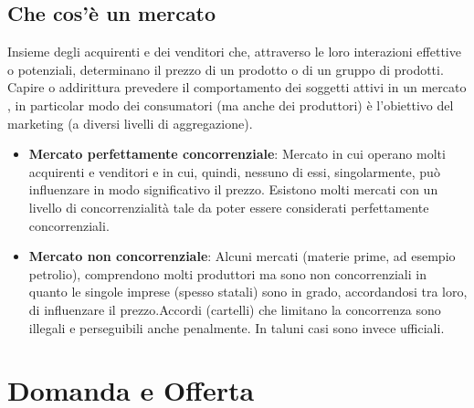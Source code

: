 \documentclass[12pt]{article}
\begin{document}
\subsection{Che cos'è un mercato}
Insieme degli acquirenti e dei venditori che, attraverso le loro interazioni effettive o potenziali, determinano il prezzo di un prodotto o di un gruppo di prodotti. Capire o addirittura prevedere il comportamento dei soggetti attivi in un mercato , in particolar
modo dei consumatori (ma anche dei produttori) è l’obiettivo del marketing (a diversi livelli di aggregazione).
\begin{itemize}
    \item \textbf{Mercato perfettamente concorrenziale}: Mercato in cui operano molti acquirenti e venditori e in cui, quindi, nessuno di essi, singolarmente, può influenzare in modo significativo il prezzo. Esistono molti mercati con un livello di concorrenzialità tale da poter essere considerati perfettamente concorrenziali.
    \item \textbf{Mercato non concorrenziale}: Alcuni mercati (materie prime, ad esempio petrolio), comprendono molti produttori ma sono non concorrenziali in quanto le singole imprese (spesso statali) sono in grado, accordandosi tra loro, di influenzare il prezzo.Accordi (cartelli) che limitano la concorrenza sono illegali e perseguibili anche penalmente. In taluni casi sono invece ufficiali.
\end{itemize}
\newpage
\section{Domanda e Offerta}
\end{document}
